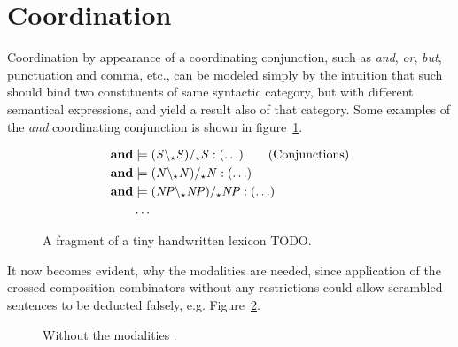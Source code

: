 \section{Coordination}
Coordination by appearance of a coordinating conjunction, such as \emph{and}, \emph{or}, \emph{but}, punctuation and comma, etc., can be modeled simply by the intuition that such should bind two constituents of same syntactic category, but with different semantical expressions, and yield a result also of that category. Some examples of the \emph{and} coordinating conjunction is shown in figure~\ref{fig:conjunctionLex}.
\begin{figure}[ht]
\vspace{-.5em}
\begin{align*}
  \mathbf{and}       &\models ({\mathit{S}} \backslash_\star {\mathit{S}}) /_\star {\mathit{S}}    : (\ldots)    \tag{Conjunctions} \\
  \mathbf{and}       &\models ({\mathit{N}} \backslash_\star {\mathit{N}}) /_\star {\mathit{N}}    : (\ldots)     \\
  \mathbf{and}       &\models ({\mathit{NP}} \backslash_\star {\mathit{NP}}) /_\star {\mathit{NP}} : (\ldots)  \\
  &\hdots 
\end{align*}
\vspace{-1.5em}
\caption{A fragment of a tiny handwritten lexicon TODO.}
\label{fig:conjunctionLex}
\end{figure}

It now becomes evident, why the modalities are needed, since application of the crossed composition combinators without any restrictions could allow scrambled sentences to be deducted falsely, e.g. Figure~\ref{fig:withoutModalities}. 
\begin{figure}[ht]
\center
{}
\caption{Without the modalities .}
\label{fig:withoutModalities}
\vspace{-.5em}
\end{figure}

